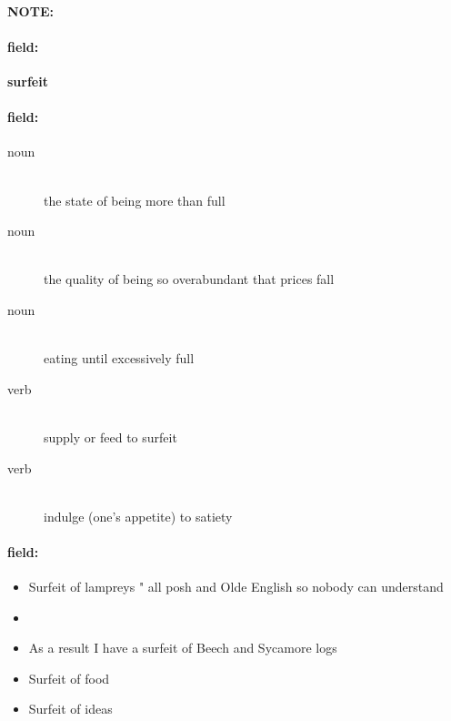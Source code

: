 \documentclass[12pt]{article}
\newenvironment{note}{\paragraph{NOTE:}}{}
\newenvironment{field}{\paragraph{field:}}{}
\begin{document}
\begin{note}
\begin{field}
\textbf{\large surfeit}
\end{field}


\begin{field}
\begin{description}
\item[noun] \hfill \\ 
the state of being more than full

\item[noun] \hfill \\ 
the quality of being so overabundant that prices fall

\item[noun] \hfill \\ 
eating until excessively full

\item[verb] \hfill \\ 
supply or feed to surfeit

\item[verb] \hfill \\ 
indulge (one's appetite) to satiety

\end{description}
\end{field}

\begin{field}
\begin{itemize}
\item Surfeit of lampreys " all posh and Olde English so nobody can understand
\item 
\item As a result I have a surfeit of Beech and Sycamore logs
\item Surfeit of food
\item Surfeit of ideas
\end{itemize}
\end{field}
\end{note}
\end{document}
